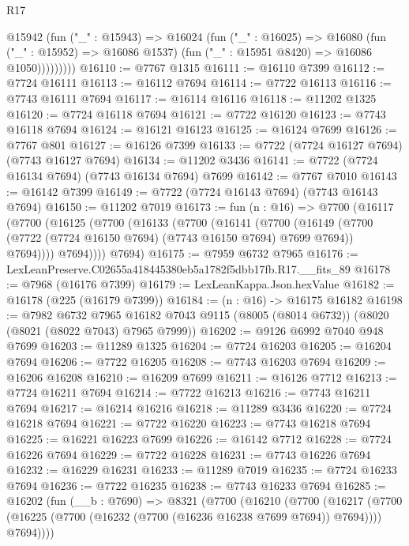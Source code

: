 \begin{lexlean}{R17}
\begin{coremodule}
              @15942
                (fun ("_" : @15943) =>
                @16024
                  (fun ("_" : @16025) =>
                  @16080
                    (fun ("_" : @15952) => @16086 @1537)
                    (fun ("_" : @15951 @8420) => @16086 @1050)))))))))
@16110 := @7767 @1315
@16111 := @16110 @7399
@16112 := @7724 @16111
@16113 := @16112 @7694
@16114 := @7722 @16113
@16116 := @7743 @16111 @7694
@16117 := @16114 @16116
@16118 := @11202 @1325
@16120 := @7724 @16118 @7694
@16121 := @7722 @16120
@16123 := @7743 @16118 @7694
@16124 := @16121 @16123
@16125 := @16124 @7699
@16126 := @7767 @801
@16127 := @16126 @7399
@16133 := @7722 (@7724 @16127 @7694) (@7743 @16127 @7694)
@16134 := @11202 @3436
@16141 := @7722 (@7724 @16134 @7694) (@7743 @16134 @7694) @7699
@16142 := @7767 @7010
@16143 := @16142 @7399
@16149 := @7722 (@7724 @16143 @7694) (@7743 @16143 @7694)
@16150 := @11202 @7019
@16173 := fun (n : @16) =>
  @7700
    (@16117
      (@7700
        (@16125
          (@7700
            (@16133
              (@7700
                (@16141
                  (@7700
                    (@16149
                      (@7700 (@7722 (@7724 @16150 @7694) (@7743 @16150 @7694) @7699 @7694))
                      @7694))))
              @7694))))
      @7694)
@16175 := @7959 @6732 @7965
@16176 := LexLeanPreserve.C02655a418445380eb5a1782f5dbb17fb.R17.__fits_89
@16178 := @7968 (@16176 @7399)
@16179 := LexLeanKappa.Json.hexValue
@16182 := @16178 (@225 (@16179 @7399))
@16184 := (n : @16) -> @16175 @16182
@16198 := @7982
    @6732
    @7965
    @16182
    @7043
    @9115
    (@8005 (@8014 @6732))
    (@8020 (@8021 (@8022 @7043) @7965 @7999))
@16202 := @9126 @6992 @7040 @948 @7699
@16203 := @11289 @1325
@16204 := @7724 @16203
@16205 := @16204 @7694
@16206 := @7722 @16205
@16208 := @7743 @16203 @7694
@16209 := @16206 @16208
@16210 := @16209 @7699
@16211 := @16126 @7712
@16213 := @7724 @16211 @7694
@16214 := @7722 @16213
@16216 := @7743 @16211 @7694
@16217 := @16214 @16216
@16218 := @11289 @3436
@16220 := @7724 @16218 @7694
@16221 := @7722 @16220
@16223 := @7743 @16218 @7694
@16225 := @16221 @16223 @7699
@16226 := @16142 @7712
@16228 := @7724 @16226 @7694
@16229 := @7722 @16228
@16231 := @7743 @16226 @7694
@16232 := @16229 @16231
@16233 := @11289 @7019
@16235 := @7724 @16233 @7694
@16236 := @7722 @16235
@16238 := @7743 @16233 @7694
@16285 := @16202
    (fun (__b : @7690) =>
    @8321
      (@7700
        (@16210
          (@7700
            (@16217
              (@7700 (@16225 (@7700 (@16232 (@7700 (@16236 @16238 @7699 @7694)) @7694))))
              @7694))))

\end{coremodule}
\end{lexlean}
